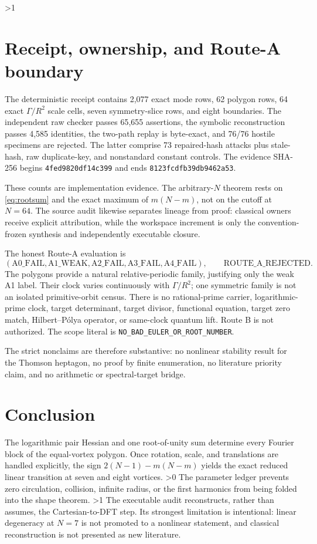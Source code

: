 \documentclass[10pt]{article}
\providecommand{\CRevisionRound}{2}
\begin{document}
\ifnum\CRevisionRound>1
\section{Receipt, ownership, and Route-A boundary}

The deterministic receipt contains 2,077 exact mode rows, 62 polygon rows, 64
exact $\Gamma/R^2$ scale cells, seven symmetry-slice rows, and eight
boundaries.  The independent raw checker passes 65,655 assertions, the
symbolic reconstruction passes 4,585 identities, the two-path replay is
byte-exact, and 76/76 hostile specimens are rejected.  The latter comprise
73 repaired-hash attacks plus stale-hash, raw duplicate-key, and nonstandard
constant controls.  The evidence SHA-256 begins
\texttt{4fed9820df14c399} and ends \texttt{8123fcdfb39db9462a53}.

These counts are implementation evidence.  The arbitrary-$N$ theorem rests
on \eqref{eq:rootsum} and the exact maximum of $m(N-m)$, not on the cutoff at
$N=64$.  The source audit likewise separates lineage from proof: classical
owners receive explicit attribution, while the workspace increment is only
the convention-frozen synthesis and independently executable closure.

The honest Route-A evaluation is
\[
 (\mathrm{A0\_FAIL},\mathrm{A1\_WEAK},\mathrm{A2\_FAIL},
   \mathrm{A3\_FAIL},\mathrm{A4\_FAIL}),
 \qquad \mathrm{ROUTE\_A\_REJECTED}.                        \label{eq:route}
\]
The polygons provide a natural relative-periodic family, justifying only the
weak A1 label.  Their clock varies continuously with $\Gamma/R^2$; one
symmetric family is not an isolated primitive-orbit census.  There is no
rational-prime carrier, logarithmic-prime clock, target determinant, target
divisor, functional equation, target zero match, Hilbert--P\'olya operator, or
same-clock quantum lift.  Route B is not authorized.  The scope literal is
\texttt{NO\_BAD\_EULER\_OR\_ROOT\_NUMBER}.

The strict nonclaims are therefore substantive: no nonlinear stability result
for the Thomson heptagon, no proof by finite enumeration, no literature
priority claim, and no arithmetic or spectral-target bridge.
\fi

\section{Conclusion}

The logarithmic pair Hessian and one root-of-unity sum determine every
Fourier block of the equal-vortex polygon.  Once rotation, scale, and
translations are handled explicitly, the sign
$2(N-1)-m(N-m)$ yields the exact reduced linear transition at seven and eight
vortices.
\ifnum\CRevisionRound>0
The parameter ledger prevents zero circulation, collision, infinite radius,
or the first harmonics from being folded into the shape theorem.
\fi
\ifnum\CRevisionRound>1
The executable audit reconstructs, rather than assumes, the Cartesian-to-DFT
step.  Its strongest limitation is intentional: linear degeneracy at $N=7$
is not promoted to a nonlinear statement, and classical reconstruction is not
presented as new literature.
\fi
\end{document}
